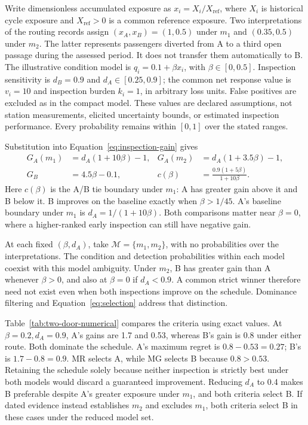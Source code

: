 \documentclass[symmetry,article,submit,pdftex,oneauthor]{Definitions/mdpi}
\begin{document}
Write dimensionless accumulated exposure as $x_i=X_i/X_{\mathrm{ref}}$, where $X_i$ is historical cycle exposure and $X_{\mathrm{ref}}>0$ is a common reference exposure. Two interpretations of the routing records assign $(x_A,x_B)=(1,0.5)$ under $m_1$ and $(0.35,0.5)$ under $m_2$. The latter represents passengers diverted from A to a third open passage during the assessed period. It does not transfer them automatically to B. The illustrative condition model is $q_i=0.1+\beta x_i$, with $\beta\in[0,0.5]$. Inspection sensitivity is $d_B=0.9$ and $d_A\in[0.25,0.9]$; the common net response value is $v_i=10$ and inspection burden $k_i=1$, in arbitrary loss units. False positives are excluded as in the compact model. These values are declared assumptions, not station measurements, elicited uncertainty bounds, or estimated inspection performance. Every probability remains within $[0,1]$ over the stated ranges.

Substitution into Equation~\ref{eq:inspection-gain} gives
\begin{equation}
\begin{aligned}
G_A(m_1)&=d_A(1+10\beta)-1, &
G_A(m_2)&=d_A(1+3.5\beta)-1,\\
G_B&=4.5\beta-0.1, &
c(\beta)&=\frac{0.9(1+5\beta)}{1+10\beta}.
\end{aligned}
\label{eq:numerical-gains}
\end{equation}
Here $c(\beta)$ is the A/B tie boundary under $m_1$: A has greater gain above it and B below it. B improves on the baseline exactly when $\beta>1/45$. A's baseline boundary under $m_1$ is $d_A=1/(1+10\beta)$. Both comparisons matter near $\beta=0$, where a higher-ranked early inspection can still have negative gain.

At each fixed $(\beta,d_A)$, take $\mathcal M=\{m_1,m_2\}$, with no probabilities over the interpretations. The condition and detection probabilities within each model coexist with this model ambiguity. Under $m_2$, B has greater gain than A whenever $\beta>0$, and also at $\beta=0$ if $d_A<0.9$. A common strict winner therefore need not exist even when both inspections improve on the schedule. Dominance filtering and Equation~\ref{eq:selection} address that distinction.



Table~\ref{tab:two-door-numerical} compares the criteria using exact values. At $\beta=0.2,d_A=0.9$, A's gains are 1.7 and 0.53, whereas B's gain is 0.8 under either route. Both dominate the schedule. A's maximum regret is $0.8-0.53=0.27$; B's is $1.7-0.8=0.9$. MR selects A, while MG selects B because $0.8>0.53$. Retaining the schedule solely because neither inspection is strictly best under both models would discard a guaranteed improvement. Reducing $d_A$ to 0.4 makes B preferable despite A's greater exposure under $m_1$, and both criteria select B. If dated evidence instead establishes $m_2$ and excludes $m_1$, both criteria select B in these cases under the reduced model set.
\end{document}

